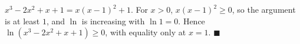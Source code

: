 $x^3-2x^2+x+1=x(x-1)^2+1$. For $x>0$, $x(x-1)^2\ge0$, so the argument is at least $1$, and $\ln$ is increasing with $\ln1=0$. Hence $\ln\left(x^3-2x^2+x+1\right)\ge0$, with equality only at $x=1$. $\blacksquare$
